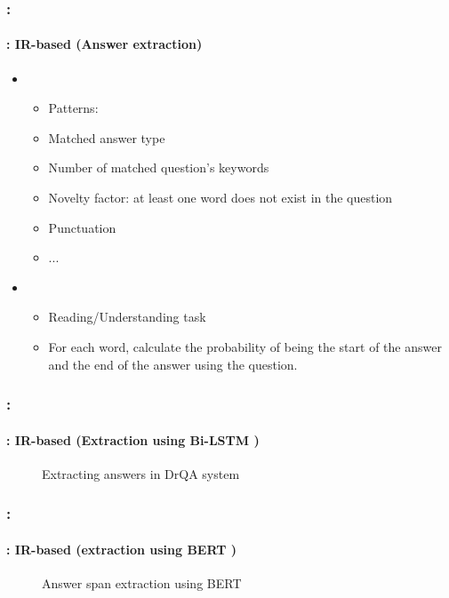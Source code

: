 \documentclass[xcolor=table]{beamer}
\begin{document}
\begin{frame}
	\frametitle{\insertshortsubtitle: \insertsection}
	\framesubtitle{\insertsubsection: IR-based (Answer extraction)}
	
	\begin{itemize}
		\item {}
		\begin{itemize}
			\item Patterns: 
			\item Matched answer type
			\item Number of matched question's keywords 
			\item Novelty factor: at least one word does not exist in the question
			\item Punctuation
			\item ...
		\end{itemize}
		\item {}
		\begin{itemize}
			\item Reading/Understanding task
			\item For each word, calculate the probability of being the start of the answer and the end of the answer using the question.
		\end{itemize}
	\end{itemize}
	
\end{frame}

\begin{frame}
	\frametitle{\insertshortsubtitle: \insertsection}
	\framesubtitle{\insertsubsection: IR-based (Extraction using Bi-LSTM \cite{2017-chen-al})}
	
	\vskip-6pt
	\begin{figure}
		\vskip-3pt
		\caption{Extracting answers in DrQA system \cite{2019-jurafsky-martin}}
	\end{figure}
	
\end{frame}

\begin{frame}
	\frametitle{\insertshortsubtitle: \insertsection}
	\framesubtitle{\insertsubsection: IR-based (extraction using BERT \cite{2018-devlin-al})}
	
	\begin{figure}
		\centering
		\caption{Answer span extraction using BERT \cite{2019-jurafsky-martin}}
	\end{figure}
	
\end{frame}
\end{document}
